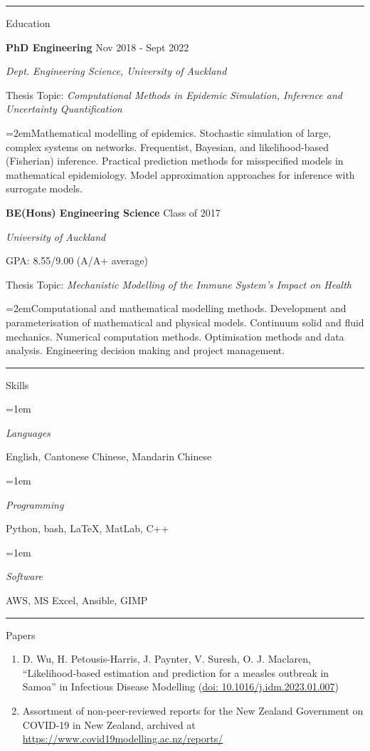 \documentclass[paper=a4paper,fontsize=11pt]{scrartcl}
\newcommand{\pagerule}[1][2pt]{\noindent\rule{\textwidth}{#1}}
\newcommand{\usingfont}[2]{#1 #2 \par \normalsize \normalfont}
\newcommand{\sectionheader}[1]{\pagerule \vspace{0.05ex} \usingfont{\usefont{T1}{phv}{m}{v} \Large}{\noindent \hspace{-0.5em} #1} \vspace{0.75ex}}
\newlength{\spacebox}
\newcommand{\indented}[1][2em]{\noindent\hangindent=#1\hangafter=0}
\begin{document}
\sectionheader{Education}
\noindent \textbf{PhD Engineering} \hfill
Nov 2018 - Sept 2022 \par
\noindent \textit{Dept. Engineering Science, University of
Auckland} \par
\small Thesis Topic: \emph{Computational Methods in Epidemic Simulation,
Inference and Uncertainty Quantification} \par
\indented \small Mathematical modelling of epidemics. Stochastic
simulation of large, complex systems on networks. Frequentist, Bayesian,
and likelihood-based (Fisherian) inference. Practical prediction methods
for misspecified models in mathematical epidemiology. Model
approximation approaches for inference with surrogate models.
\normalsize \par\par
\noindent \textbf{BE(Hons) Engineering Science} \hfill
Class of 2017 \par
\noindent \textit{University of Auckland} \par
\small GPA: 8.55/9.00 (A/A+ average) \par
\small Thesis Topic: \emph{Mechanistic Modelling of the Immune System's
Impact on Health} \par
\indented \small Computational and mathematical modelling methods.
Development and parameterisation of mathematical and physical models.
Continuum solid and fluid mechanics. Numerical computation methods.
Optimisation methods and data analysis. Engineering decision making and
project management.
\normalsize \par\par

\sectionheader{Skills}
\indented[1em] \parbox{\spacebox}{\textit{Languages}} 
\hspace{1.5em} English, Cantonese Chinese, Mandarin Chinese
\par
\indented[1em] \parbox{\spacebox}{\textit{Programming}} 
\hspace{1.5em} Python, bash, \LaTeX, MatLab, C++
\par
\indented[1em] \parbox{\spacebox}{\textit{Software}} 
\hspace{1.5em} AWS, MS Excel, Ansible, GIMP
\par

\sectionheader{Papers}
\vspace{-2ex}
\begin{enumerate}
\itemsep-0.25em
\item 
D. Wu, H. Petousis-Harris, J. Paynter, V. Suresh, O. J.
Maclaren, ``Likelihood-based estimation and prediction for a measles
outbreak in Samoa'' in Infectious Disease
Modelling (\href{https://doi.org/10.1016/j.idm.2023.01.007}{doi:
10.1016/j.idm.2023.01.007})
\item 
Assortment of non-peer-reviewed reports for the New Zealand Government
on COVID-19 in New Zealand, archived at
\url{https://www.covid19modelling.ac.nz/reports/}
\end{enumerate}
\vspace{-2ex}
\end{document}
